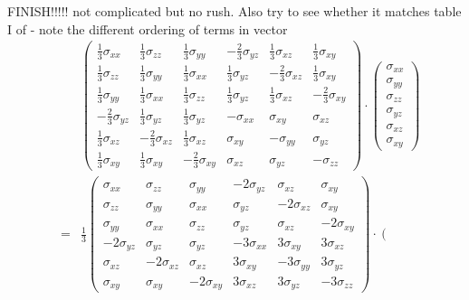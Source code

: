 FINISH!!!!! not complicated but no rush. Also try to see whether it matches
table I of \textcite{zico74} - note the different ordering of terms in vector
\begin{eqnarray}
&&
\left(
\begin{array}{cccccc}
\frac13 \sigma_{xx} & \frac13\sigma_{zz} & \frac13\sigma_{yy} & 
-\frac23 \sigma_{yz} & \frac13\sigma_{xz} & \frac13\sigma_{xy}\\
\frac13\sigma_{zz} & \frac13\sigma_{yy} & \frac13 \sigma_{xx} &
\frac13 \sigma_{yz} & -\frac23\sigma_{xz} & \frac13\sigma_{xy}\\
\frac13\sigma_{yy} & \frac13 \sigma_{xx} & \frac13\sigma_{zz} &
\frac13 \sigma_{yz} & \frac13\sigma_{xz} & -\frac23\sigma_{xy}\\
-\frac23 \sigma_{yz} & \frac13 \sigma_{yz} & \frac13 \sigma_{yz}&
-\sigma_{xx} & \sigma_{xy} & \sigma_{xz} \\
\frac13\sigma_{xz} & -\frac23\sigma_{xz} & \frac13\sigma_{xz} &
\sigma_{xy} & -\sigma_{yy} & \sigma_{yz} \\
\frac13\sigma_{xy} & \frac13\sigma_{xy} & -\frac23\sigma_{xy} &
\sigma_{xz} & \sigma_{yz} & -\sigma_{zz}
\end{array}
\right)
\cdot
\left(
\begin{array}{c}
\sigma_{xx}\\
\sigma_{yy}\\
\sigma_{zz}\\
\sigma_{yz}\\
\sigma_{xz}\\
\sigma_{xy}
\end{array}
\right)\\
&=&
\frac13
\left(
\begin{array}{cccccc}
 \sigma_{xx} & \sigma_{zz} & \sigma_{yy} & 
-2 \sigma_{yz} & \sigma_{xz} & \sigma_{xy}\\
\sigma_{zz} & \sigma_{yy} &  \sigma_{xx} &
 \sigma_{yz} & -2\sigma_{xz} & \sigma_{xy}\\
\sigma_{yy} & \sigma_{xx} & \sigma_{zz} &
 \sigma_{yz} & \sigma_{xz} & -2\sigma_{xy}\\
-2 \sigma_{yz} & \sigma_{yz} &  \sigma_{yz} &
-3\sigma_{xx} & 3\sigma_{xy} & 3\sigma_{xz} \\
\sigma_{xz} & -2\sigma_{xz} & \sigma_{xz} &
3\sigma_{xy} & -3\sigma_{yy} & 3\sigma_{yz} \\
\sigma_{xy} & \sigma_{xy} & -2\sigma_{xy} &
3\sigma_{xz} & 3\sigma_{yz} & -3\sigma_{zz}
\end{array}
\right)
\cdot
\left(
\begin{array}{c}

\end{array}
\end{eqnarray}
